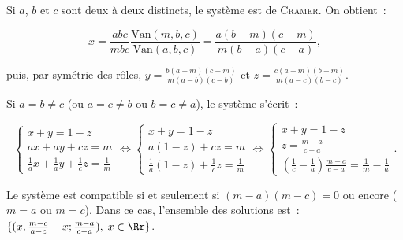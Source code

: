 {\begin{enumerate}
{Si $a$, $b$ et $c$ sont deux à deux distincts, le système est de \textsc{Cramer}. On obtient~:

$$x=\frac{abc}{mbc}\frac{\mbox{Van}(m,b,c)}{\mbox{Van}(a,b,c)}=\frac{a(b-m)(c-m)}{m(b-a)(c-a)},$$

puis, par symétrie des rôles, $y=\frac{b(a-m)(c-m)}{m(a-b)(c-b)}$ et $z=\frac{c(a-m)(b-m)}{m(a-c)(b-c)}$.

Si $a=b\neq c$ (ou $a=c\neq b$ ou $b=c\neq a$), le système s'écrit~:

$$\left\{
\begin{array}{l}
x+y=1-z\\
ax+ay+cz=m\\
\frac{1}{a}x+\frac{1}{a}y+\frac{1}{c}z=\frac{1}{m}
\end{array}
\right.\Leftrightarrow\left\{
\begin{array}{l}
x+y=1-z\\
a(1-z)+cz=m\\
\frac{1}{a}(1-z)+\frac{1}{c}z=\frac{1}{m}
\end{array}
\right.\Leftrightarrow\left\{
\begin{array}{l}
x+y=1-z\\
z=\frac{m-a}{c-a}\\
(\frac{1}{c}-\frac{1}{a})\frac{m-a}{c-a}=\frac{1}{m}-\frac{1}{a}
\end{array}
\right..$$

Le système est compatible si et seulement si $(m-a)(m-c)=0$ ou encore ($m=a$ ou $m=c$). Dans ce cas, l'ensemble des solutions est~:~$\{(x,\frac{m-c}{a-c}-x;\frac{m-a}{c-a}),\;x\in\Rr\}$.

}
\end{enumerate}}
